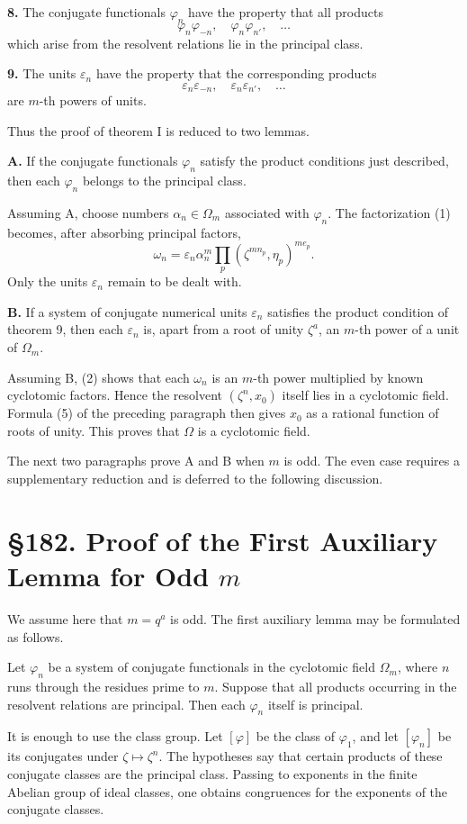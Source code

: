 \documentclass[11pt,a4paper]{book}
\newcommand{\webersection}[2]{\clearpage\section*{\S #1. #2}}
\newcommand{\zetaS}{\zeta}
\providecommand{\Om}{\Omega_m}
\begin{document}
\textbf{8.} The conjugate functionals \(\varphi_n\) have the property that all products
\[
  \varphi_n\varphi_{-n},\quad \varphi_n\varphi_{n'},\quad\ldots
\]
which arise from the resolvent relations lie in the principal class.

\textbf{9.} The units \(\varepsilon_n\) have the property that the corresponding products
\[
  \varepsilon_n\varepsilon_{-n},\quad \varepsilon_n\varepsilon_{n'},\quad\ldots
\]
are \(m\)-th powers of units.

Thus the proof of theorem I is reduced to two lemmas.

\textbf{A.} If the conjugate functionals \(\varphi_n\) satisfy the product conditions just described, then each \(\varphi_n\) belongs to the principal class.

Assuming A, choose numbers \(\alpha_n\in\Om\) associated with \(\varphi_n\).  The factorization (1) becomes, after absorbing principal factors,
\[
  \omega_n=\varepsilon_n\alpha_n^m
       \prod_p (\zetaS^{m n_p},\eta_p)^{m e_p}.
\tag{2}
\]
Only the units \(\varepsilon_n\) remain to be dealt with.

\textbf{B.} If a system of conjugate numerical units \(\varepsilon_n\) satisfies the product condition of theorem 9, then each \(\varepsilon_n\) is, apart from a root of unity \(\zetaS^a\), an \(m\)-th power of a unit of \(\Om\).

Assuming B, (2) shows that each \(\omega_n\) is an \(m\)-th power multiplied by known cyclotomic factors.  Hence the resolvent \((\zetaS^n,x_0)\) itself lies in a cyclotomic field.  Formula (5) of the preceding paragraph then gives \(x_0\) as a rational function of roots of unity.  This proves that \(\Omega\) is a cyclotomic field.

The next two paragraphs prove A and B when \(m\) is odd.  The even case requires a supplementary reduction and is deferred to the following discussion.

\webersection{182}{Proof of the First Auxiliary Lemma for Odd \(m\)}

We assume here that \(m=q^a\) is odd.  The first auxiliary lemma may be formulated as follows.

Let \(\varphi_n\) be a system of conjugate functionals in the cyclotomic field \(\Om\), where \(n\) runs through the residues prime to \(m\).  Suppose that all products occurring in the resolvent relations are principal.  Then each \(\varphi_n\) itself is principal.

It is enough to use the class group.  Let \([\varphi]\) be the class of \(\varphi_1\), and let \([\varphi_n]\) be its conjugates under \(\zetaS\mapsto\zetaS^n\).  The hypotheses say that certain products of these conjugate classes are the principal class.  Passing to exponents in the finite Abelian group of ideal classes, one obtains congruences for the exponents of the conjugate classes.
\end{document}
